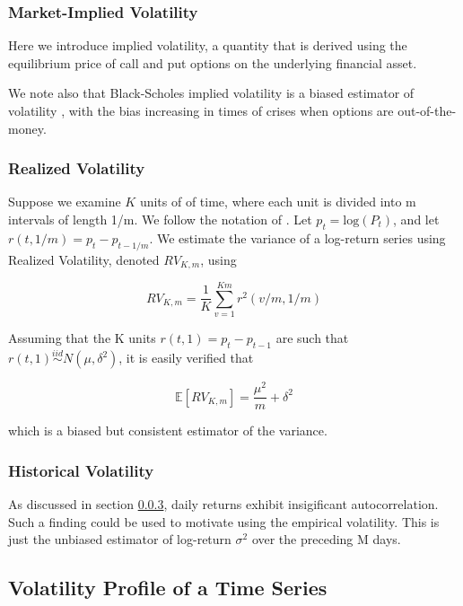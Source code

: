 \documentclass[11pt]{article}
\newcommand{\simiid}{\stackrel{iid}{\sim}} %
\def\E{\mathbb{E}} %
\theoremstyle{definition}
\begin{document}
\subsubsection{Market-Implied Volatility}

Here we introduce implied volatility, a quantity that is derived using the equilibrium price of call and put options on the underlying financial asset.

We note also that Black-Scholes implied volatility is a biased estimator of volatility \citep{mayhew1995implied, christensen1998relation}, with the bias increasing in times of crises when options are out-of-the-money.

\subsubsection{Realized Volatility}

Suppose we examine $K$ units of of time, where each unit is divided into m intervals of length 1/m.  We follow the notation of  \citet{andersen2009realized}. Let $p_{t} = \text{log}(P_{t})$, and let $r(t, 1/m) = p_{t} - p_{t-1/m}$.  We estimate the variance of a log-return series using Realized Volatility, denoted $RV_{K,m}$, using

$$RV_{K,m} = \frac{1}{K}\sum^{Km}_{v=1}r^{2}(v/m,1/m)$$

Assuming that the K units $r(t, 1) = p_{t} - p_{t-1}$ are such that $r(t, 1) \simiid N(\mu, \delta^{2})$, it is easily verified that 

$$\E[RV_{K,m}] = \frac{\mu^{2}}{m} + \delta^{2}$$

which is a biased but consistent estimator of the variance.

\subsubsection{Historical Volatility}\label{historical_volatility}

As discussed in section \ref{historical_volatility}, daily returns exhibit insigificant autocorrelation.  Such a finding could be used to motivate using the empirical volatility.  This is just the unbiased estimator of log-return $\sigma^{2}$ over the preceding M days.

\subsection{Volatility Profile of a Time Series}
\label{Volatility Profile of a Time Series}
\end{document}
